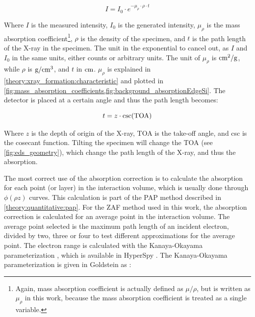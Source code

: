 \begin{equation}
    \label{eq:theory:quantitative:absorption}
    I = I_0 \cdot e^{-\mu_{\rho} \cdot \rho \cdot t}
\end{equation}

Where $I$ is the measured intensity, $I_0$ is the generated intensity, $\mu_{\rho}$ is the mass absorption coefficient\footnote{Again, mass absorption coefficient is actually defined as $\mu/\rho$, but is written as $\mu_\rho$ in this work, because the mass absorption coefficient is treated as a single variable.},
$\rho$ is the density of the specimen, and $t$ is the path length of the X-ray in the specimen.
The unit in the exponential to cancel out, as $I$ and $I_0$ in the same units, either counts or arbitrary units.
The unit of $\mu_{\rho}$ is $\textnormal{cm}^2/\textnormal{g}$, while $\rho$ is $\textnormal{g}/\textnormal{cm}^3$, and $t$ in $\textnormal{cm}$.
$\mu_{\rho}$ is explained in \cref{theory:xray_formation:characteristic} and plotted in \cref{fig:mass_absorption_coefficients,fig:background_absorptionEdgeSi}. 
The detector is placed at a certain angle and thus the path length becomes:

\begin{equation}
    \label{eq:theory:quantitative:path_length}
    t = z \cdot \csc(\textnormal{TOA})
\end{equation}

Where $z$ is the depth of origin of the X-ray, TOA is the take-off angle, and csc is the cosecant function.
Tilting the specimen will change the TOA (see \cref{fig:eds_geometry}), which change the path length of the X-ray, and thus the absorption.


The most correct use of the absorption correction is to calculate the absorption for each point (or layer) in the interaction volume, which is usually done through $\phi(\rho z)$ curves.
This calculation is part of the PAP method described in \cref{theory:quantitative:pap}.
For the ZAF method used in this work, the absorption correction is calculated for an average point in the interaction volume.
The average point selected is the maximum path length of an incident electron, divided by two, three or four to test different approximations for the average point.
The electron range is calculated with the Kanaya-Okayama parameterization \cite{kanaya1972}, which is available in HyperSpy \cite{hyperspy_1.7.1}.
The Kanaya-Okayama parameterization is given in Goldstein as \cite[22.5]{goldstein_scanning_2018}:


